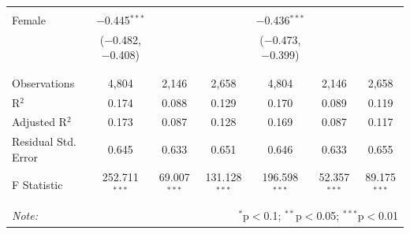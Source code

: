 \documentclass[12pt,a4paper]{article}
\numberwithin{equation}{section}
\begin{document}
\begin{landscape}
\begin{table}[!htbp]
\begin{tabular}{@{\extracolsep{5pt}}lcccccc}
			& & & & & & \\ 
			Female & $-$0.445$^{***}$ &  &  & $-$0.436$^{***}$ &  &  \\ 
			& ($-$0.482, $-$0.408) &  &  & ($-$0.473, $-$0.399) &  &  \\ 
			& & & & & & \\ 
			\hline \\[-1.8ex] 
			Observations & 4,804 & 2,146 & 2,658 & 4,804 & 2,146 & 2,658 \\ 
			R$^{2}$ & 0.174 & 0.088 & 0.129 & 0.170 & 0.089 & 0.119 \\ 
			Adjusted R$^{2}$ & 0.173 & 0.087 & 0.128 & 0.169 & 0.087 & 0.117 \\ 
			Residual Std. Error & 0.645 & 0.633 & 0.651 & 0.646 & 0.633 & 0.655 \\ 
			F Statistic & 252.711$^{***}$ & 69.007$^{***}$ & 131.128$^{***}$ & 196.598$^{***}$ & 52.357$^{***}$ & 89.175$^{***}$ \\ 
			\hline 
			\hline \\[-1.8ex] 
			\textit{Note:}  & \multicolumn{6}{r}{$^{*}$p$<$0.1; $^{**}$p$<$0.05; $^{***}$p$<$0.01} \\ 
		\end{tabular} 
	\end{table} 
	
\end{landscape}

\newpage
\end{document}

